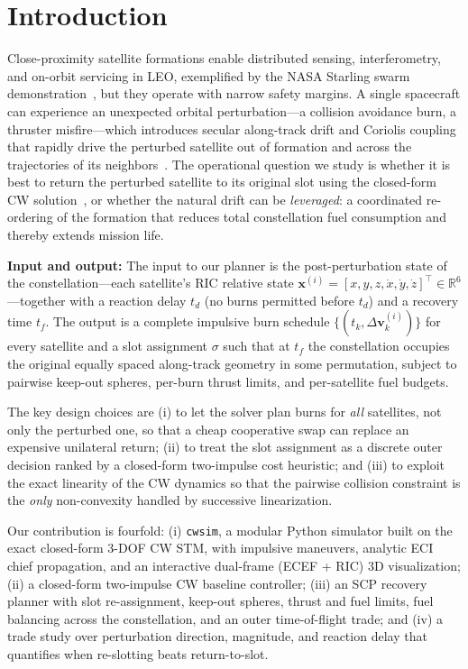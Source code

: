 \documentclass[10pt,twocolumn,letterpaper]{article}
\begin{document}
\section{Introduction}
\label{sec:intro}

Close-proximity satellite formations enable distributed sensing,
interferometry, and on-orbit servicing in LEO, exemplified by the NASA
Starling swarm demonstration~\cite{nasa_starling}, but they operate with
narrow safety margins. A single spacecraft can experience an unexpected
orbital perturbation---a collision avoidance burn, a thruster misfire---which
introduces secular along-track drift and Coriolis coupling that rapidly drive
the perturbed satellite out of formation and across the trajectories of its
neighbors~\cite{vallado2013}. The operational question we study is whether it
is best to return the perturbed satellite to its original slot using the
closed-form CW solution~\cite{cw1960}, or whether the natural drift can be
\emph{leveraged}: a coordinated re-ordering of the formation that reduces
total constellation fuel consumption and thereby extends mission life.

\textbf{Input and output:} The input to our planner is the post-perturbation
state of the constellation---each satellite's RIC relative state
$\mathbf{x}^{(i)} = [x, y, z, \dot{x}, \dot{y}, \dot{z}]^\top \in
\mathbb{R}^6$---together with a reaction delay $t_d$ (no burns permitted
before $t_d$) and a recovery time $t_f$. The output is a complete impulsive
burn schedule $\{(t_k, \Delta\mathbf{v}^{(i)}_k)\}$ for every satellite and a
slot assignment $\sigma$ such that at $t_f$ the constellation occupies the
original equally spaced along-track geometry in some permutation, subject to
pairwise keep-out spheres, per-burn thrust limits, and per-satellite fuel
budgets.

The key design choices are (i) to let the solver plan burns for \emph{all}
satellites, not only the perturbed one, so that a cheap cooperative swap can
replace an expensive unilateral return; (ii) to treat the slot assignment as
a discrete outer decision ranked by a closed-form two-impulse cost heuristic;
and (iii) to exploit the exact linearity of the CW dynamics so that the
pairwise collision constraint is the \emph{only} non-convexity handled by
successive linearization.

Our contribution is fourfold: (i) \texttt{cwsim}, a modular Python simulator
built on the exact closed-form 3-DOF CW STM, with impulsive maneuvers,
analytic ECI chief propagation, and an interactive dual-frame (ECEF + RIC) 3D
visualization; (ii) a closed-form two-impulse CW baseline controller;
(iii) an SCP recovery planner with slot re-assignment, keep-out spheres,
thrust and fuel limits, fuel balancing across the constellation, and an outer
time-of-flight trade; and (iv) a trade study over perturbation direction,
magnitude, and reaction delay that quantifies when re-slotting beats
return-to-slot.
\end{document}

